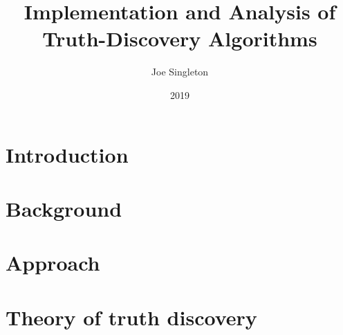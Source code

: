 \documentclass{article}
\date{2019}
\author{Joe Singleton}
\title{Implementation and Analysis of Truth-Discovery Algorithms}
\theoremstyle{definition} \newtheorem{definition}{Definition}
\theoremstyle{definition} \newtheorem{example}{Example}
\theoremstyle{plain} \newtheorem{axiom}{Axiom}
\theoremstyle{plain} \newtheorem*{remark}{Remark}
\theoremstyle{remark} \newtheorem*{notation}{Notation}
\theoremstyle{plain} \newtheorem{lemma}{Lemma}
\theoremstyle{plain} \newtheorem{theorem}{Theorem}
\theoremstyle{plain} \newtheorem{proposition}{Proposition}
\begin{document}
\maketitle



\tableofcontents

\section{Introduction}


\section{Background}


\section{Approach}
\label{sec:approach}

% 

\section{Theory of truth discovery}


{}


\appendix


\end{document}
